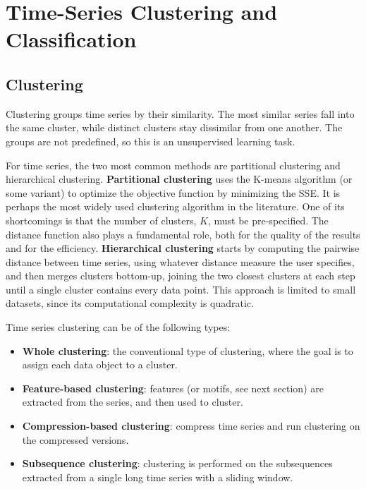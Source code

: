 \section{Time-Series Clustering and Classification}

\subsection{Clustering}

Clustering groups time series by their similarity. The most similar series fall into the same cluster, while distinct clusters stay dissimilar from one another. The groups are not predefined, so this is an unsupervised learning task.

For time series, the two most common methods are partitional clustering and hierarchical clustering. \textbf{Partitional clustering} uses the K-means algorithm (or some variant) to optimize the objective function by minimizing the SSE. It is perhaps the most widely used clustering algorithm in the literature. One of its shortcomings is that the number of clusters, $K$, must be pre-specified. The distance function also plays a fundamental role, both for the quality of the results and for the efficiency. \textbf{Hierarchical clustering} starts by computing the pairwise distance between time series, using whatever distance measure the user specifies, and then merges clusters bottom-up, joining the two closest clusters at each step until a single cluster contains every data point. This approach is limited to small datasets, since its computational complexity is quadratic.

Time series clustering can be of the following types:
\begin{itemize}
    \item \textbf{Whole clustering}: the conventional type of clustering, where the goal is to assign each data object to a cluster.

    \item \textbf{Feature-based clustering}: features (or motifs, see next section) are extracted from the series, and then used to cluster.

    \item \textbf{Compression-based clustering}: compress time series and run clustering on the compressed versions.

    \item \textbf{Subsequence clustering}: clustering is performed on the subsequences extracted from a single long time series with a sliding window.
\end{itemize}

